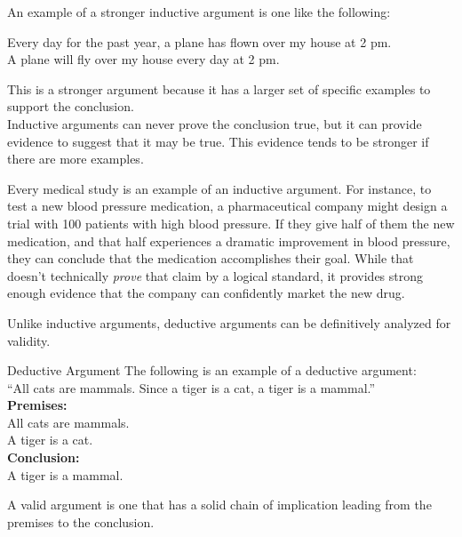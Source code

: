 An example of a stronger inductive argument is one like the following:
\begin{center}
Every day for the past year, a plane has flown over my house at 2 pm.\\
A plane will fly over my house every day at 2 pm.
\end{center}
This is a stronger argument because it has a larger set of specific examples to support the conclusion.\\

Inductive arguments can never prove the conclusion true, but it can provide evidence to suggest that it may be true.  This evidence tends to be stronger if there are more examples.

Every medical study is an example of an inductive argument.  For instance, to test a new blood pressure medication, a pharmaceutical company might design a trial with 100 patients with high blood pressure.  If they give half of them the new medication, and that half experiences a dramatic improvement in blood pressure, they can conclude that the medication accomplishes their goal.  While that doesn't technically \textit{prove} that claim by a logical standard, it provides strong enough evidence that the company can confidently market the new drug.

Unlike inductive arguments, deductive arguments can be definitively analyzed for validity.
\vfill
\pagebreak

\begin{example}[https://www.youtube.com/watch?v=TIVWCVyZrVw]{Deductive Argument}
\setcounter{dedarg}{\theExampleCounter}
The following is an example of a deductive argument:\\
``All cats are mammals.  Since a tiger is a cat, a tiger is a mammal.''\\

\textbf{Premises:}\\
All cats are mammals.\\
A tiger is a cat.\\

\textbf{Conclusion:}\\
A tiger is a mammal.
\end{example}

A valid argument is one that has a solid chain of implication leading from the premises to the conclusion.\\

